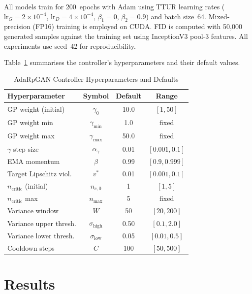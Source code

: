 \documentclass[journal]{IEEEtran}
\newcommand{\vtarget}{v^{*}}
\newcommand{\ncritic}{n_{\mathrm{critic}}}
\newcommand{\ncmax}{n_{\mathrm{max}}}
\begin{document}
All models train for 200~epochs with Adam using TTUR learning rates ($\mathrm{lr}_G = 2{\times}10^{-4}$, $\mathrm{lr}_D = 4{\times}10^{-4}$, $\beta_1=0$, $\beta_2=0.9$) and batch size~64. Mixed-precision (FP16) training is employed on CUDA. FID is computed with 50{,}000 generated samples against the training set using InceptionV3 pool-3 features. All experiments use seed~42 for reproducibility.

Table~\ref{tab:hyperparams} summarises the controller's hyperparameters and their default values.

\begin{table}[t]
\caption{AdaRpGAN Controller Hyperparameters and Defaults}
\label{tab:hyperparams}
\centering
\begin{tabular}{l c c c}
\toprule
\textbf{Hyperparameter} & \textbf{Symbol} & \textbf{Default} & \textbf{Range} \\
\midrule
GP weight (initial)       & $\gamma_0$          & 10.0   & $[1, 50]$        \\
GP weight min             & $\gamma_{\min}$     & 1.0    & fixed            \\
GP weight max             & $\gamma_{\max}$     & 50.0   & fixed            \\
$\gamma$ step size        & $\alpha_\gamma$     & 0.01   & $[0.001, 0.1]$   \\
EMA momentum              & $\beta$             & 0.99   & $[0.9, 0.999]$   \\
Target Lipschitz viol.    & $\vtarget$          & 0.01   & $[0.001, 0.1]$   \\
$\ncritic$ (initial)      & $n_{c,0}$           & 1      & $[1, 5]$         \\
$\ncritic$ max            & $\ncmax$            & 5      & fixed            \\
Variance window           & $W$                 & 50     & $[20, 200]$      \\
Variance upper thresh.    & $\sigma_{\mathrm{high}}$ & 0.50 & $[0.1, 2.0]$ \\
Variance lower thresh.    & $\sigma_{\mathrm{low}}$  & 0.05 & $[0.01, 0.5]$\\
Cooldown steps            & $C$                 & 100    & $[50, 500]$      \\
\bottomrule
\end{tabular}
\end{table}

\section{Results}
\label{sec:results}
\end{document}
